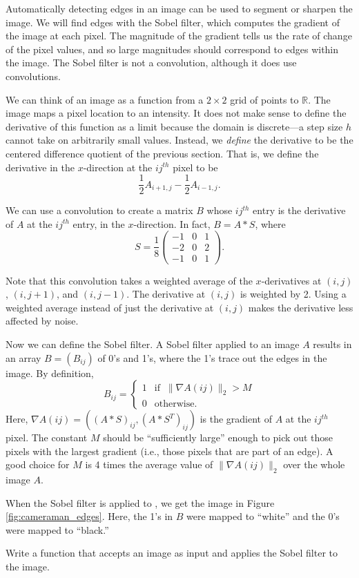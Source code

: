Automatically detecting edges in an image can be used to segment or sharpen the image. 
We will find edges with the Sobel filter, which computes the gradient of the image at each pixel. 
The magnitude of the gradient tells us the rate of change of the pixel values, and so large magnitudes should
correspond to edges within the image. 
The Sobel filter is not a convolution, although it does use convolutions.

We can think of an image as a function from a $2 \times 2$ grid of points to $\mathbb{R}$.
The image maps a pixel location to an intensity.
It does not make sense to define the derivative of this function as a limit because the domain is discrete---a step size $h$ cannot take on arbitrarily small values.
Instead, we \emph{define} the derivative to be the centered difference quotient of the previous section.
That is, we define the derivative in the $x$-direction at the $ij^{th}$ pixel to be 
\[
\frac{1}{2}A_{i+1, j} - \frac{1}{2}A_{i-1, j}.
\]

We can use a convolution to create a matrix $B$ whose $ij^{th}$ entry is the derivative of $A$ at the $ij^{th}$ entry, in the $x$-direction.
In fact, $B = A \ast S$, where
\[
S = \frac{1}{8} \begin{pmatrix}
-1 & 0 & 1\\
-2 & 0 & 2\\
-1 & 0 & 1
\end{pmatrix}.
\]

Note that this convolution takes a weighted average of the $x$-derivatives at $(i, j)$, $(i, j+1)$, and $(i, j-1)$. 
The derivative at $(i, j)$ is weighted by 2.
Using a weighted average instead of just the derivative at $(i, j)$ makes the derivative less affected by noise.

Now we can define the Sobel filter. 
A Sobel filter applied to an image $A$ results in an array $B = (B_{ij})$ of 0's and 1's, where the 1's trace out the edges in the image. 
By definition,
\[
B_{ij} = \left\{
     \begin{array}{ll}
       1 & \text{if}\; \;\|\nabla A(ij)\|_2 > M \\
       0 & \text{otherwise}.
     \end{array}
   \right.
\]
Here, $\nabla A(ij) = ((A \ast S)_{ij}, (A\ast S^T)_{ij})$ is the gradient of $A$ at the $ij^{th}$ pixel.
The constant $M$ should be ``sufficiently large'' enough to pick out those pixels with the largest gradient (i.e., those pixels that are part of an edge).
A good choice for $M$ is 4 times the average value of $\|\nabla A(ij)\|_2$ over the whole image $A$.


When the Sobel filter is applied to , we get the image in Figure \ref{fig:cameraman_edges}. 
Here, the 1's in $B$ were mapped to ``white'' and the 0's were mapped to ``black.''




\begin{problem}
Write a function that accepts an image as input and applies the Sobel filter to the image.
\end{problem}



